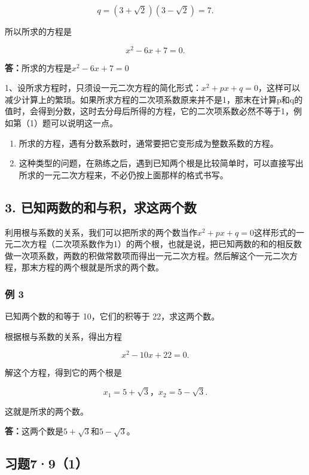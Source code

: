 \[
q = (3 + \sqrt {2}) (3 - \sqrt {2}) = 7.
\]

所以所求的方程是

\[
x ^ {2} - 6 x + 7 = 0.
\]

\textbf{答：}所求的方程是\(x^{2} - 6x + 7 = 0\)


1、设所求方程时，只须设一元二次方程的简化形式：\(x^{2}+px+q=0\)，这样可以减少计算上的繁琐。如果所求方程的二次项系数原来并不是1，那末在计算p和q的值时，会得到分数，这时去分母后所得的方程，它的二次项系数必然不等于1，例如第（1）题可以说明这一点。

\begin{enumerate}[start=2]
\item
  所求的方程，遇有分数系数时，通常要把它变形成为整数系数的方程。
\item
  这种类型的问题，在熟练之后，遇到已知两个根是比较简单时，可以直接写出所求的一元二次方程来，不必仍按上面那样的格式书写。
\end{enumerate}

\subsection{3. 已知两数的和与积，求这两个数}

利用根与系数的关系，我们可以把所求的两个数当作\(x^{2} + px + q = 0\)这样形式的一元二次方程（二次项系数作为1）的两个根，也就是说，把已知两数的和的相反数做一次项系数，两数的积做常数项而得出一元二次方程。然后解这个一元二次方程，那末方程的两个根就是所求的两个数。

\subsubsection{例 3}

已知两个数的和等于 10，它们的积等于 22，求这两个数。

 根据根与系数的关系，得出方程

\[
x ^ {2} - 10 x + 22 = 0.
\]

解这个方程，得到它的两个根是

\[
x _ {1} = 5 + \sqrt {3}\text{，} x _ {2} = 5 - \sqrt {3}.
\]

这就是所求的两个数。

\textbf{答：}这两个数是\(5 + \sqrt{3}\)和\(5 - \sqrt{3}\)。

\subsection{习题7·9（1）}

